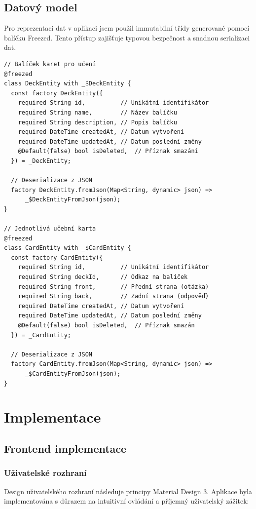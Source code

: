 \documentclass[12pt, a4paper, oneside]{report}
\begin{document}
	\section{Datový model}
	Pro reprezentaci dat v aplikaci jsem použil immutabilní třídy generované pomocí balíčku Freezed. Tento přístup zajišťuje typovou bezpečnost a snadnou serializaci dat.

	\begin{lstlisting}[style=Python, caption=Definice datových modelů]
// Balíček karet pro učení
@freezed
class DeckEntity with _$DeckEntity {
  const factory DeckEntity({
    required String id,          // Unikátní identifikátor
    required String name,        // Název balíčku
    required String description, // Popis balíčku
    required DateTime createdAt, // Datum vytvoření
    required DateTime updatedAt, // Datum poslední změny
    @Default(false) bool isDeleted,  // Příznak smazání
  }) = _DeckEntity;

  // Deserializace z JSON
  factory DeckEntity.fromJson(Map<String, dynamic> json) => 
      _$DeckEntityFromJson(json);
}

// Jednotlivá učební karta
@freezed
class CardEntity with _$CardEntity {
  const factory CardEntity({
    required String id,          // Unikátní identifikátor
    required String deckId,      // Odkaz na balíček
    required String front,       // Přední strana (otázka)
    required String back,        // Zadní strana (odpověď)
    required DateTime createdAt, // Datum vytvoření
    required DateTime updatedAt, // Datum poslední změny
    @Default(false) bool isDeleted,  // Příznak smazán
  }) = _CardEntity;

  // Deserializace z JSON
  factory CardEntity.fromJson(Map<String, dynamic> json) => 
      _$CardEntityFromJson(json);
}
	\end{lstlisting}

\chapter{Implementace}
	\section{Frontend implementace}
	\subsection{Uživatelské rozhraní}
	Design uživatelského rozhraní následuje principy Material Design 3. Aplikace byla implementována s důrazem na intuitivní ovládání a příjemný uživatelský zážitek:
\end{document}
